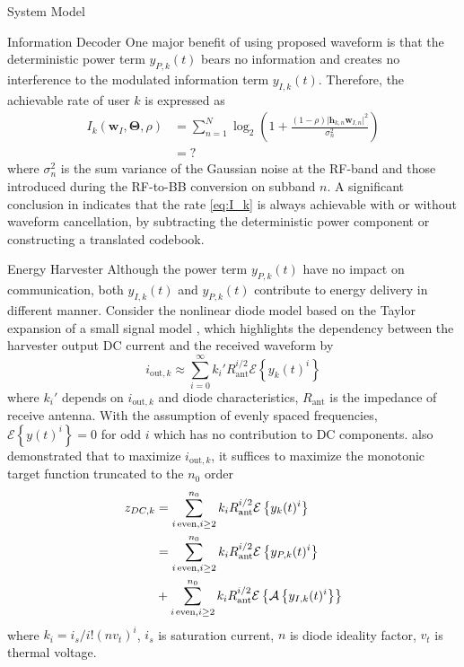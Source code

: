 \documentclass{IEEEtran}
\begin{document}
\begin{section} {System Model}
	\begin{subsection}	{Information Decoder}
		One major benefit of using proposed waveform is that the deterministic power term $y_{P,k}(t)$ bears no information and creates no interference to the modulated information term $y_{I,k}(t)$. Therefore, the achievable rate of user $k$ is expressed as
		\begin{equation}	\label{eq:I_k}
			\begin{split}
				I_k(\boldsymbol{w}_I,\boldsymbol{\Theta},\rho)
				&=\sum_{n=1}^N{\log_2\left(1+\frac{(1-\rho)\lvert\boldsymbol{h}_{k,n}\boldsymbol{w}_{I,n}\rvert^2}{\sigma_n^2}\right)}	\\
				&=?
			\end{split}
		\end{equation}
		where $\sigma_n^2$ is the sum variance of the Gaussian noise at the RF-band and those introduced during the RF-to-BB conversion on subband $n$. A significant conclusion in \cite{Clerckx2018b} indicates that the rate \ref{eq:I_k} is always achievable with or without waveform cancellation, by subtracting the deterministic power component or constructing a translated codebook.
	\end{subsection}

	\begin{subsection}	{Energy Harvester}
		Although the power term $y_{P,k}(t)$ have no impact on communication, both $y_{I,k}(t)$ and $y_{P,k}(t)$ contribute to energy delivery in different manner. Consider the nonlinear diode model based on the Taylor expansion of a small signal model \cite{Clerckx2018b,Clerckx2016a}, which highlights the dependency between the harvester output DC current and the received waveform by
		\begin{equation}	\label{eq:i_k}
			i_{\text{out},k}\approx\sum_{i=0}^{\infty}{k_i'}{R_{\text{ant}}^{i/2}}{\mathcal{E}\left\{y_k(t)^i\right\}}
		\end{equation}
		where $k_i'$ depends on $i_{\text{out},k}$ and diode characteristics, $R_{\text{ant}}$ is the impedance of receive antenna. With the assumption of evenly spaced frequencies, $\mathcal{E}\left\{y(t)^i\right\}=0$ for odd $i$ which has no contribution to DC components. \cite{Clerckx2016a} also demonstrated that to maximize $i_{\text{out},k}$, it suffices to maximize the monotonic target function truncated to the $n_0$ order
		\begin{equation}	\label{eq:z_{DC,k}}
			\begin{split}
				z_{DC,k}
				&=\sum_{i\,\text{even},i\ge2}^{n_0}{k_i}{R_{\text{ant}}^{i/2}}{\mathcal{E}\left\{y_k(t)^i\right\}}	\\
				&=\sum_{i\,\text{even},i\ge2}^{n_0}{k_i}{R_{\text{ant}}^{i/2}}{\mathcal{E}\left\{y_{P,k}(t)^i\right\}}	\\
				&+\sum_{i\,\text{even},i\ge2}^{n_0}{k_i}{R_{\text{ant}}^{i/2}}{\mathcal{E}\left\{\mathcal{A}\left\{y_{I,k}(t)^i\right\}\right\}}
			\end{split}
		\end{equation}
		where $k_i=i_s/i!(nv_t)^i$, $i_s$ is saturation current, $n$ is diode ideality factor, $v_t$ is thermal voltage.



\end{subsection}
\end{section}
\end{document}
